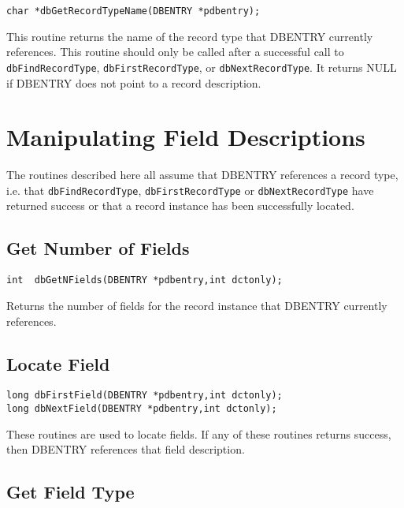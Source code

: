 \begin{verbatim}
char *dbGetRecordTypeName(DBENTRY *pdbentry);
\end{verbatim}

This routine returns the name of the record type that DBENTRY currently references. This routine should only be called 
after a successful call to \verb|dbFindRecordType|, \verb|dbFirstRecordType|, or \verb|dbNextRecordType|. It returns NULL if 
DBENTRY does not point to a record description.

\section{Manipulating Field Descriptions}

The routines described here all assume that DBENTRY references a record type, i.e. that \verb|dbFindRecordType|, \verb|dbFirstRecordType| or \verb|dbNextRecordType| have returned success or that a record instance has been successfully located.

\subsection{Get Number of Fields}

\begin{verbatim}
int  dbGetNFields(DBENTRY *pdbentry,int dctonly);
\end{verbatim}

Returns the number of fields for the record instance that DBENTRY currently references.

\subsection{Locate Field}

\begin{verbatim}
long dbFirstField(DBENTRY *pdbentry,int dctonly);
long dbNextField(DBENTRY *pdbentry,int dctonly);
\end{verbatim}

These routines are used to locate fields. If any of these routines returns success, then DBENTRY references that field 
description. 

\subsection{Get Field Type}

